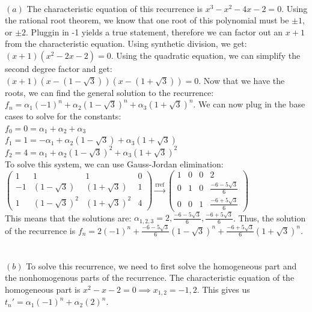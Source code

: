 \documentclass[11pt]{article}
\begin{document}
\newpage
\begin{solution} \\
	$(a)$ 
		The characteristic equation of this recurrence is $x^3 - x^2 -4x - 2 = 0$. Using the rational root theorem, we know that one root of this polynomial must be $\pm1$, or $\pm 2$. Pluggin in -1 yields a true statement, therefore we can factor out an $x+1$ from the characteristic equation. Using synthetic division, we get: $(x+1)(x^2 - 2x - 2) = 0$. Using the quadratic equation, we can simplify the second degree factor and get: $(x+1)(x - (1 - \sqrt{3}))(x-(1+ \sqrt{3})) = 0$. Now that we have the roots, we can find the general solution to the recurrence: $f_n = \alpha_1(-1)^n + \alpha_2(1 - \sqrt{3})^n + \alpha_3(1 + \sqrt{3})^n $. We can now plug in the base cases to solve for the constants: 
		\\ $f_0 = 0 = \alpha_1 + \alpha_2 + \alpha_3$ 
		\\ $ f_1 = 1 = -\alpha_1 + \alpha_2(1-\sqrt{3}) + \alpha_3(1+\sqrt{3}) $ 
		\\ $ f_2 = 4 = \alpha_1 + \alpha_2(1-\sqrt{3})^2 + \alpha_3(1+\sqrt{3})^2 $ 
		\\ To solve this system, we can use Gauss-Jordan elimination: \\
		$
			\begin{pmatrix}
			1 & 1 & 1 & 0 \\
			-1 & (1-\sqrt{3}) & (1+\sqrt{3}) & 1 \\
			1 & (1-\sqrt{3})^2 & (1+\sqrt{3})^2 & 4
			\end{pmatrix} 
			\xrightarrow[\text{}]{\text{rref}}
			\begin{pmatrix}
				1 & 0 & 0 & 2 \\
				0 & 1 & 0 & \frac{-6 - 5\sqrt{3}}{6} \\
				0 & 0 & 1 & \frac{-6 + 5\sqrt{3}}{6}
			\end{pmatrix} 
		$
		\\ This means that the solutions are: $\alpha_{1,2,3} = 2, \frac{-6 - 5\sqrt{3}}{6}, \frac{-6 + 5\sqrt{3}}{6} $. Thus, the solution of the recurrence is $f_n = 2(-1)^n + \frac{-6 - 5\sqrt{3}}{6}(1 - \sqrt{3})^n + \frac{-6 + 5\sqrt{3}}{6}(1 + \sqrt{3})^n $.
	\\\\\\
	$(b)$ To solve this recurrence, we need to first solve the homogeneous part and the nonhomogenous parts of the recurrence. The characteristic equation of the homogeneous part is $x^2 - x - 2 = 0 \implies x_{1,2} = -1, 2$. This gives us $t_n' = \alpha_1 (-1)^n + \alpha_2 (2)^n$.

\end{solution}
\end{document}
